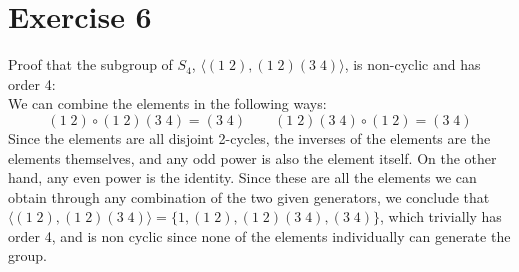 \documentclass[12pt]{article}
\begin{document}
    \section*{Exercise 6}
    Proof that the subgroup of $S_4$,
    $\langle (1\;2), (1\;2)(3\;4) \rangle$,
    is non-cyclic and has order 4: \\
    We can combine the elements in the following ways:
    \[ (1\;2) \circ (1\;2)(3\;4) = (3\;4) \qquad
    (1\;2)(3\;4) \circ (1\;2) = (3\;4) \]
    Since the elements are all disjoint 2-cycles,
    the inverses of the elements are the elements themselves,
    and any odd power is also the element itself.
    On the other hand, any even power is the identity.
    Since these are all the elements we can obtain
    through any combination of the two given generators,
    we conclude that $\langle (1\;2), (1\;2)(3\;4) \rangle
    = \{1, (1\;2), (1\;2)(3\;4), (3\;4)\}$,
    which trivially has order 4, and is non cyclic
    since none of the elements individually can generate the group.
\end{document}
